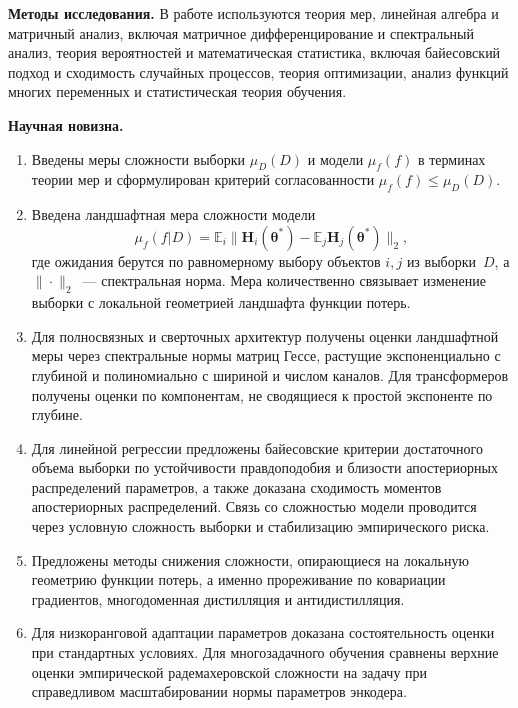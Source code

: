 \documentclass{dissert}
\newcommand{\paragraph}[1]{\noindent\textbf{#1}\quad}
\begin{document}
\paragraph{Методы исследования.}
В работе используются теория мер, линейная алгебра и матричный анализ, включая матричное дифференцирование и спектральный анализ, теория вероятностей и математическая статистика, включая байесовский подход и сходимость случайных процессов, теория оптимизации, анализ функций многих переменных и статистическая теория обучения.

\paragraph{Научная новизна.}
\begin{enumerate}
    \item Введены меры сложности выборки $\mu_D(D)$ и модели $\mu_f(f)$ в терминах теории мер и сформулирован критерий согласованности $\mu_f(f) \le \mu_D(D)$.
    \item Введена ландшафтная мера сложности модели
    \[
    \mu_f(f|D) = \mathbb{E}_{i}\big\|\mathbf{H}_{i}(\boldsymbol{\theta}^*)-\mathbb{E}_{j}\mathbf{H}_{j}(\boldsymbol{\theta}^*)\big\|_2,
    \]
    где ожидания берутся по равномерному выбору объектов $i,j$ из выборки~$D$, а $\|\cdot\|_2$~--- спектральная норма. Мера количественно связывает изменение выборки с локальной геометрией ландшафта функции потерь.
    \item Для полносвязных и сверточных архитектур получены оценки ландшафтной меры через спектральные нормы матриц Гессе, растущие экспоненциально с глубиной и полиномиально с шириной и числом каналов. Для трансформеров получены оценки по компонентам, не сводящиеся к простой экспоненте по глубине.
    \item Для линейной регрессии предложены байесовские критерии достаточного объема выборки по устойчивости правдоподобия и близости апостериорных распределений параметров, а также доказана сходимость моментов апостериорных распределений. Связь со сложностью модели проводится через условную сложность выборки и стабилизацию эмпирического риска.
    \item Предложены методы снижения сложности, опирающиеся на локальную геометрию функции потерь, а именно прореживание по ковариации градиентов, многодоменная дистилляция и антидистилляция.
    \item Для низкоранговой адаптации параметров доказана состоятельность оценки при стандартных условиях. Для многозадачного обучения сравнены верхние оценки эмпирической радемахеровской сложности на задачу при справедливом масштабировании нормы параметров энкодера.
\end{enumerate}
\end{document}
